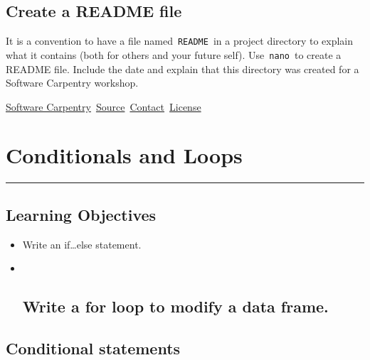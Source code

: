 \documentclass[
]{book}
\begin{document}
\hypertarget{create-a-readme-file}{%
\section{Create a README file}\label{create-a-readme-file}}

It is a convention to have a file named~\texttt{README}~in a project directory to explain what it contains (both for others and your future self). Use~\texttt{nano}~to create a README file. Include the date and explain that this directory was created for a Software Carpentry workshop.

\href{http://software-carpentry.org/}{Software Carpentry}~\href{https://github.com/jdblischak/r-intermediate-altmetrics}{Source}~\href{mailto:admin@software-carpentry.org}{Contact}~\href{https://jdblischak.github.io/r-intermediate-altmetrics/LICENSE.html}{License}

\hypertarget{conditionals-and-loops}{%
\chapter{Conditionals and Loops}\label{conditionals-and-loops}}

\begin{center}\rule{0.5\linewidth}{0.5pt}\end{center}

\hypertarget{learning-objectives-1}{%
\section{Learning Objectives}\label{learning-objectives-1}}

\begin{itemize}
\item
  Write an if\ldots else statement.
\item ~
  \hypertarget{write-a-for-loop-to-modify-a-data-frame.}{%
  \section{Write a for loop to modify a data frame.}\label{write-a-for-loop-to-modify-a-data-frame.}}
\end{itemize}

\hypertarget{conditional-statements}{%
\section{Conditional statements}\label{conditional-statements}}
\end{document}
